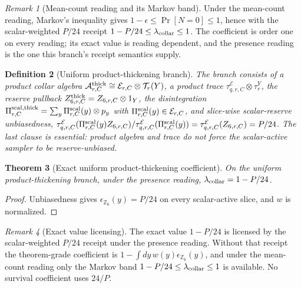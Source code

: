 \documentclass[11pt]{article}
\newtheorem{theorem}{Theorem}[section]
\newtheorem{definition}[theorem]{Definition}
\theoremstyle{remark}
\newtheorem{remark}[theorem]{Remark}
\theoremstyle{plain}
\begin{document}
\begin{remark}[Mean-count reading and its Markov band]
\label{rem:mean-count-markov-band}
Under the mean-count reading, Markov's inequality gives
\(1-\epsilon\le\Pr[N=0]\le1\), hence with the scalar-weighted \(P/24\)
receipt \(1-P/24\le\lambda_{\rm collar}\le1\). The coefficient is order one
on every reading; its exact value is reading dependent, and the presence
reading is the one this branch's receipt semantics supply.
\end{remark}

\begin{definition}[Uniform product-thickening branch]
\label{def:uniform-product-thickening-branch}
The branch consists of a product collar algebra
\(\mathcal A^{\rm thick}_{r,C}\cong\mathcal E_{r,C}\otimes\mathcal T_r(Y)\),
a product trace \(\tau^{\mathcal E}_{q,r,C}\otimes\tau^Y_r\), the reserve
pullback \(Z^{\rm thick}_{6,r,C}=Z_{6,r,C}\otimes1_Y\), the disintegration
\(\Pi^{\rm scal,thick}_{r,C}=\sum_y\Pi^{\rm scal}_{r,C}(y)\otimes p_y\) with
\(\Pi^{\rm scal}_{r,C}(y)\in\mathcal E_{r,C}\), and slice-wise scalar-reserve
unbiasedness,
\(\tau^{\mathcal E}_{q,r,C}(\Pi^{\rm scal}_{r,C}(y)Z_{6,r,C})/
\tau^{\mathcal E}_{q,r,C}(\Pi^{\rm scal}_{r,C}(y))=\tau^{\mathcal E}_{q,r,C}(Z_{6,r,C})=P/24\).
The last clause is essential: product algebra and trace do not force the
scalar-active sampler to be reserve-unbiased.
\end{definition}

\begin{theorem}[Exact uniform product-thickening coefficient]
\label{thm:exact-uniform-product-thickening-coefficient}
On the uniform product-thickening branch, under the presence reading,
\(\lambda_{\rm collar}=1-P/24\).
\end{theorem}

\begin{proof}
Unbiasedness gives \(\epsilon_{\mathbb Z_6}(y)=P/24\) on every scalar-active
slice, and \(w\) is normalized.
\end{proof}

\begin{remark}[Exact value licensing]
\label{rem:exact-value-gate}
\label{sec:local-scalar-receipt-ledger}
The exact value \(1-P/24\) is licensed by the scalar-weighted \(P/24\)
receipt under the presence reading. Without that receipt the theorem-grade
coefficient is \(1-\int dy\,w(y)\epsilon_{\mathbb Z_6}(y)\), and under the
mean-count reading only the Markov band \(1-P/24\le\lambda_{\rm collar}\le1\)
is available. No survival coefficient uses \(24/P\).
\end{remark}
\end{document}
